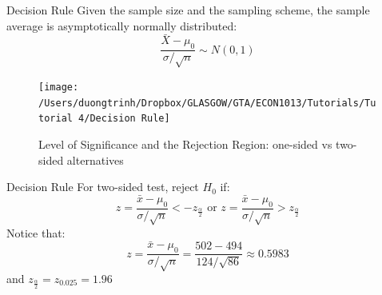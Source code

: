 \documentclass[
  10pt,
  ignorenonframetext,
]{beamer}
\begin{document}
\begin{frame}{Decision Rule}
\protect\hypertarget{decision-rule}{}
Given the sample size and the sampling scheme, the sample average is
asymptotically normally distributed: \[
\frac{\bar{X} - \mu_0}{\sigma/\sqrt{n}} \sim N(0,1)
\]

\begin{figure}
\texttt{[image: /Users/duongtrinh/Dropbox/GLASGOW/GTA/ECON1013/Tutorials/Tutorial 4/Decision Rule]} \caption{Level of Significance and the Rejection Region: one-sided vs two-sided alternatives}\label{fig:unnamed-chunk-1}
\end{figure}
\end{frame}

\begin{frame}{Decision Rule}
\protect\hypertarget{decision-rule-1}{}
For two-sided test, reject \(H_0\) if: \[
z = \frac{\bar{x}-\mu_0}{\sigma/\sqrt{n}} < - z_{\frac{\alpha}{2}} \text{ or } z = \frac{\bar{x}-\mu_0}{\sigma/\sqrt{n}} > z_{\frac{\alpha}{2}}
\] Notice that: \[
z = \frac{\bar{x}-\mu_0}{\sigma/\sqrt{n}} = \frac{502 - 494}{124/\sqrt{86}} \approx 0.5983 
\] and \(z_{\frac{\alpha}{2}} = z_{0.025} = 1.96\)
\end{frame}
\end{document}
